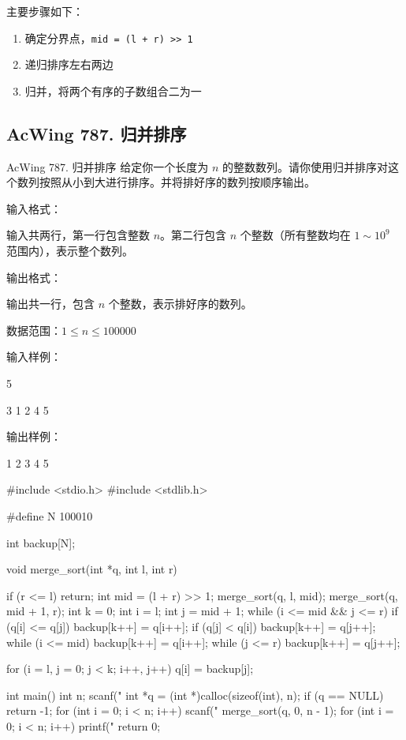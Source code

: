 主要步骤如下：
\begin{enumerate}
  \item 确定分界点，\lstinline{mid = (l + r) >> 1}
  \item 递归排序左右两边
  \item 归并，将两个有序的子数组合二为一
\end{enumerate}

\subsection{AcWing 787. 归并排序}
\begin{titledbox}{AcWing 787. 归并排序}
    给定你一个长度为 $n$ 的整数数列。请你使用归并排序对这个数列按照从小到大进行排序。并将排好序的数列按顺序输出。
  
    输入格式：
  
    输入共两行，第一行包含整数 $n$。第二行包含 $n$ 个整数（所有整数均在 $1 \sim 10^9$ 范围内），表示整个数列。
  
    输出格式：
  
    输出共一行，包含 $n$ 个整数，表示排好序的数列。
  
    数据范围：$1 \le n \le 100000$
  
    输入样例：
  
    5
  
    3 1 2 4 5
  
    输出样例：
  
    1 2 3 4 5
\end{titledbox}

\begin{mycpptwocol}
#include <stdio.h>
#include <stdlib.h>

#define N 100010

int backup[N];

void merge_sort(int *q, int l, int r)
{
    if (r <= l) {
        return;
    }
    int mid = (l + r) >> 1;
    merge_sort(q, l, mid);
    merge_sort(q, mid + 1, r);
    int k = 0;
    int i = l;
    int j = mid + 1;
    while (i <= mid && j <= r) {
        if (q[i] <= q[j]) {
            backup[k++] = q[i++];
        }
        if (q[j] < q[i]) {
            backup[k++] = q[j++];
        }
    }
    while (i <= mid) {
        backup[k++] = q[i++];
    }
    while (j <= r) {
        backup[k++] = q[j++];
    }
    
    for (i = l, j = 0; j < k; i++, j++) {
        q[i] = backup[j];
    }
}

int main()
{
    int n;
    scanf("%
    int *q = (int *)calloc(sizeof(int), n);
    if (q == NULL) {
        return -1;
    }
    for (int i = 0; i < n; i++) {
        scanf("%
    }
    merge_sort(q, 0, n - 1);
    for (int i = 0; i < n; i++) {
        printf("%
    }
    return 0;
}
\end{mycpptwocol}

